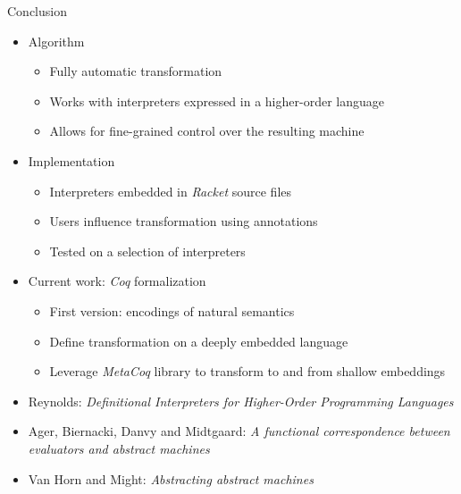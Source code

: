 \documentclass{beamer}
\begin{document}
\begin{frame}{Conclusion}
  \begin{itemize}
    \item Algorithm
    \begin{itemize}
      \item Fully automatic transformation
      \item Works with interpreters expressed in a higher-order language
      \item Allows for fine-grained control over the resulting machine
    \end{itemize}
    \pause
    \item Implementation
    \begin{itemize}
      \item Interpreters embedded in \textit{Racket} source files
      \item Users influence transformation using annotations
      \item Tested on a selection of interpreters
    \end{itemize}
    \pause
    \item Current work: \textit{Coq} formalization
    \begin{itemize}
      \item First version: encodings of natural semantics
      \item Define transformation on a deeply embedded language
      \item Leverage \textit{MetaCoq} library to transform to and from shallow embeddings
    \end{itemize}
  \end{itemize}  
\end{frame}

\begin{frame}
  \begin{itemize}
    \item Reynolds: \textit{Definitional Interpreters for Higher-Order Programming Languages}
    \item Ager, Biernacki, Danvy and Midtgaard: \textit{A functional correspondence between evaluators and abstract machines}
    \item Van Horn and Might: \textit{Abstracting abstract machines}
  \end{itemize}
\end{frame}
\end{document}
